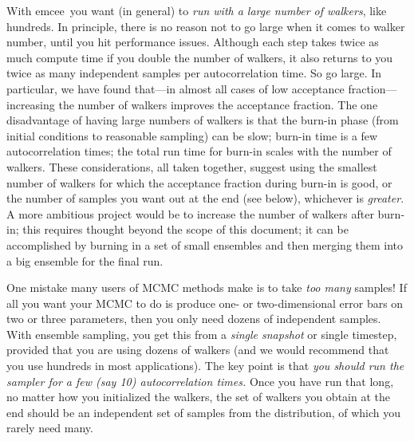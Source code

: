 \documentclass[12pt,preprint]{aastex}
\newcommand{\project}[1]{{\sffamily #1}}
\newcommand{\thisplain}{emcee}
\newcommand{\this}{\project{\thisplain}}
\begin{document}
With \this\  you want (in general) to \emph{run with a
  large number of walkers}, like hundreds.  In principle, there is no
reason not to go large when it comes to walker number, until you hit
performance issues.  Although each step takes twice as much compute
time if you double the number of walkers, it also returns to you twice
as many independent samples per autocorrelation time.  So go large.
In particular, we have found that---in almost all cases of low
acceptance fraction---increasing the number of walkers improves the
acceptance fraction.  The one disadvantage of having large numbers of
walkers is that the burn-in phase (from initial conditions to
reasonable sampling) can be slow; burn-in time is a few
autocorrelation times; the total run time for burn-in scales with the
number of walkers.  These considerations, all taken together, suggest
using the smallest number of walkers for which the acceptance fraction
during burn-in is good, or the number of samples you want out at the
end (see below), whichever is \emph{greater}.  A more ambitious
project would be to increase the number of walkers after burn-in; this
requires thought beyond the scope of this document; it can be
accomplished by burning in a set of small ensembles and then merging
them into a big ensemble for the final run.

One mistake many users of MCMC methods make is to take \emph{too many}
samples!  If all you want your MCMC to do is produce one- or
two-dimensional error bars on two or three parameters, then you only
need dozens of independent samples.  With ensemble sampling, you
get this from a \emph{single snapshot} or single timestep, provided
that you are using dozens of walkers (and we would recommend that you
use hundreds in most applications).  The key point is that \emph{you
  should run the sampler for a few (say 10) autocorrelation times.}
Once you have run that long, no matter how you initialized the
walkers, the set of walkers you obtain at the end should be an
independent set of samples from the distribution, of which you rarely
need many.
\end{document}
